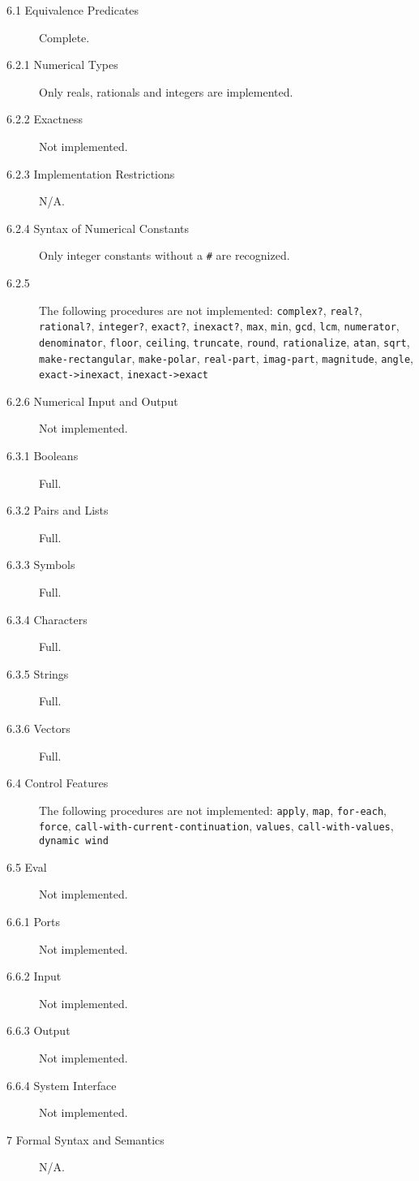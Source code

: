 \documentclass{report}
\newcommand{\code}[1]{\texttt{#1}}
\begin{document}
\begin{description}
\item[6.1 Equivalence Predicates] Complete.
\item[6.2.1 Numerical Types] Only reals, rationals and integers are
implemented. 
\item[6.2.2 Exactness] Not implemented.
\item[6.2.3 Implementation Restrictions] N/A.
\item[6.2.4 Syntax of Numerical Constants] Only integer constants
without a \code{\#} are recognized. 
\item[6.2.5] The following procedures are not implemented:
\code{complex?}, \code{real?}, \code{rational?},
\code{integer?}, \code{exact?}, \code{inexact?}, \code{max},
\code{min}, \code{gcd}, \code{lcm}, \code{numerator},
\code{denominator}, \code{floor}, \code{ceiling},
\code{truncate}, \code{round}, \code{rationalize},
\code{atan}, \code{sqrt}, \code{make-rectangular},
\code{make-polar}, \code{real-part}, \code{imag-part},
\code{magnitude}, \code{angle}, \code{exact->inexact},
\code{inexact->exact}
\item[6.2.6 Numerical Input and Output] Not implemented.

\item[6.3.1 Booleans] Full.
\item[6.3.2 Pairs and Lists] Full.
\item[6.3.3 Symbols] Full.
\item[6.3.4 Characters] Full.
\item[6.3.5 Strings] Full.
\item[6.3.6 Vectors] Full.

\item[6.4 Control Features] The following procedures are not
implemented: \code{apply}, \code{map}, \code{for-each},
\code{force}, \code{call-with-current-continuation},
\code{values}, \code{call-with-values}, \code{dynamic wind}

\item[6.5 Eval] Not implemented.

\item[6.6.1 Ports] Not implemented.
\item[6.6.2 Input] Not implemented.
\item[6.6.3 Output] Not implemented.
\item[6.6.4 System Interface] Not implemented.

\item[7 Formal Syntax and Semantics] N/A.

\end{description}
\end{document}
